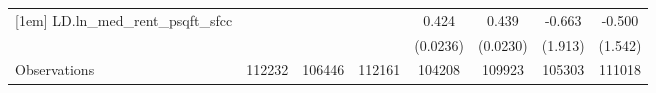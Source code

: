 {\begin{tabular}{l*{7}{c}}
[1em]
LD.ln\_med\_rent\_psqft\_sfcc&                  &                  &                  &    0.424\sym{***}&    0.439\sym{***}&   -0.663         &   -0.500         \\
          &                  &                  &                  & (0.0236)         & (0.0230)         &  (1.913)         &  (1.542)         \\
\hline
Observations&   112232         &   106446         &   112161         &   104208         &   109923         &   105303         &   111018         \\
\hline\hline
\end{tabular}
}
